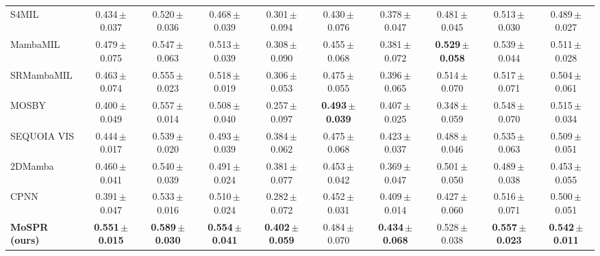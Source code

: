 \begin{tabular}{lccccccccc}
S4MIL & 0.434\,{\tiny$\pm$0.037} & 0.520\,{\tiny$\pm$0.036} & 0.468\,{\tiny$\pm$0.039} & 0.301\,{\tiny$\pm$0.094} & 0.430\,{\tiny$\pm$0.076} & 0.378\,{\tiny$\pm$0.047} & 0.481\,{\tiny$\pm$0.045} & 0.513\,{\tiny$\pm$0.030} & 0.489\,{\tiny$\pm$0.027}\\
MambaMIL & 0.479\,{\tiny$\pm$0.075} & 0.547\,{\tiny$\pm$0.063} & 0.513\,{\tiny$\pm$0.039} & 0.308\,{\tiny$\pm$0.090} & 0.455\,{\tiny$\pm$0.068} & 0.381\,{\tiny$\pm$0.072} & \textbf{0.529\,{\tiny$\pm$0.058}} & 0.539\,{\tiny$\pm$0.044} & 0.511\,{\tiny$\pm$0.028}\\
SRMambaMIL & 0.463\,{\tiny$\pm$0.074} & 0.555\,{\tiny$\pm$0.023} & 0.518\,{\tiny$\pm$0.019} & 0.306\,{\tiny$\pm$0.053} & 0.475\,{\tiny$\pm$0.055} & 0.396\,{\tiny$\pm$0.065} & 0.514\,{\tiny$\pm$0.070} & 0.517\,{\tiny$\pm$0.071} & 0.504\,{\tiny$\pm$0.061}\\
MOSBY & 0.400\,{\tiny$\pm$0.049} & 0.557\,{\tiny$\pm$0.014} & 0.508\,{\tiny$\pm$0.040} & 0.257\,{\tiny$\pm$0.097} & \textbf{0.493\,{\tiny$\pm$0.039}} & 0.407\,{\tiny$\pm$0.025} & 0.348\,{\tiny$\pm$0.059} & 0.548\,{\tiny$\pm$0.070} & 0.515\,{\tiny$\pm$0.034}\\
SEQUOIA VIS & 0.444\,{\tiny$\pm$0.017} & 0.539\,{\tiny$\pm$0.020} & 0.493\,{\tiny$\pm$0.039} & 0.384\,{\tiny$\pm$0.062} & 0.475\,{\tiny$\pm$0.068} & 0.423\,{\tiny$\pm$0.037} & 0.488\,{\tiny$\pm$0.046} & 0.535\,{\tiny$\pm$0.063} & 0.509\,{\tiny$\pm$0.051}\\
2DMamba & 0.460\,{\tiny$\pm$0.041} & 0.540\,{\tiny$\pm$0.039} & 0.491\,{\tiny$\pm$0.024} & 0.381\,{\tiny$\pm$0.077} & 0.453\,{\tiny$\pm$0.042} & 0.369\,{\tiny$\pm$0.047} & 0.501\,{\tiny$\pm$0.050} & 0.489\,{\tiny$\pm$0.038} & 0.453\,{\tiny$\pm$0.055}\\
CPNN & 0.391\,{\tiny$\pm$0.047} & 0.533\,{\tiny$\pm$0.016} & 0.510\,{\tiny$\pm$0.024} & 0.282\,{\tiny$\pm$0.072} & 0.452\,{\tiny$\pm$0.031} & 0.409\,{\tiny$\pm$0.014} & 0.427\,{\tiny$\pm$0.060} & 0.516\,{\tiny$\pm$0.071} & 0.500\,{\tiny$\pm$0.051}\\
\textbf{MoSPR (ours)} & \textbf{0.551\,{\tiny$\pm$0.015}} & \textbf{0.589\,{\tiny$\pm$0.030}} & \textbf{0.554\,{\tiny$\pm$0.041}} & \textbf{0.402\,{\tiny$\pm$0.059}} & 0.484\,{\tiny$\pm$0.070} & \textbf{0.434\,{\tiny$\pm$0.068}} & 0.528\,{\tiny$\pm$0.038} & \textbf{0.557\,{\tiny$\pm$0.023}} & \textbf{0.542\,{\tiny$\pm$0.011}}\\
\bottomrule
\end{tabular}
